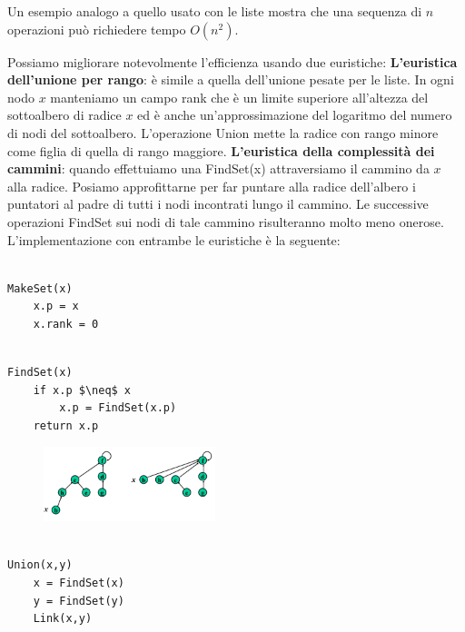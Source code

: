 Un esempio analogo a quello usato con le liste mostra che una sequenza di $n$ operazioni può richiedere tempo $O(n^2)$. 

Possiamo migliorare notevolmente l'efficienza usando due euristiche:
\linebreak
\linebreak
\textbf{L'euristica dell'unione per rango}: è simile a quella dell'unione pesate per le liste. In ogni nodo $x$ manteniamo un campo rank che è un limite superiore all'altezza del sottoalbero di radice $x$ ed è anche un'approssimazione del logaritmo del numero di nodi del sottoalbero. L'operazione Union mette la radice con rango minore come figlia di quella di rango maggiore.
\linebreak
\linebreak
\textbf{L'euristica della complessità dei cammini}: quando effettuiamo una FindSet(x) attraversiamo il cammino da $x$ alla radice. Posiamo approfittarne per far puntare alla radice dell'albero i puntatori al padre di tutti i nodi incontrati lungo il cammino. Le successive operazioni FindSet sui nodi di tale cammino risulteranno molto meno onerose.
\linebreak
\linebreak
L'implementazione con entrambe le euristiche è la seguente:

\begin{lstlisting}

MakeSet(x)
	x.p = x
	x.rank = 0

\end{lstlisting}

\begin{lstlisting}[mathescape=true]

FindSet(x)
	if x.p $\neq$ x
		x.p = FindSet(x.p)
	return x.p

\end{lstlisting}

\begin{figure}[htpd]
\centering
\includegraphics[width=50mm]{images/forest3.png}
\end{figure}

\begin{lstlisting}

Union(x,y)
	x = FindSet(x)
	y = FindSet(y)
	Link(x,y)

\end{lstlisting}

